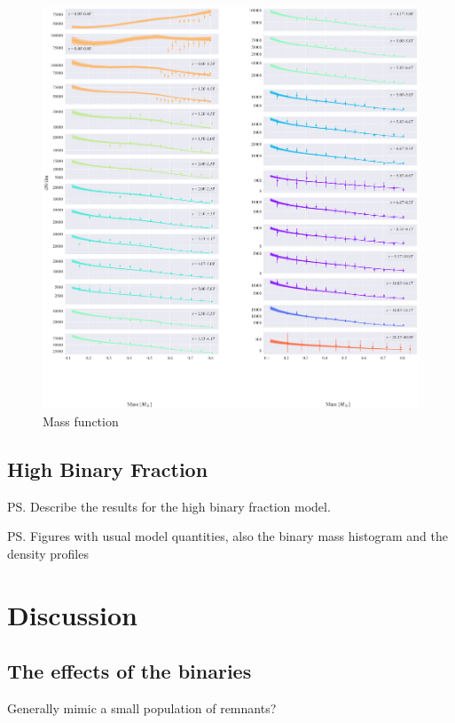 \begin{figure}
	\begin{center}
		\includegraphics[width=\textwidth]{figures/low_bin_model/mass_fun.png}
	\end{center}
	\caption{Mass function}
	\label{fig:low_bin_model_mass_fun}
\end{figure}

\subsection{High Binary Fraction}
\ps{Describe the results for the high binary fraction model.}

\ps{Figures with usual model quantities, also the binary mass histogram and the density profiles}

\section{Discussion}

\subsection{The effects of the binaries}

Generally mimic a small population of remnants?


